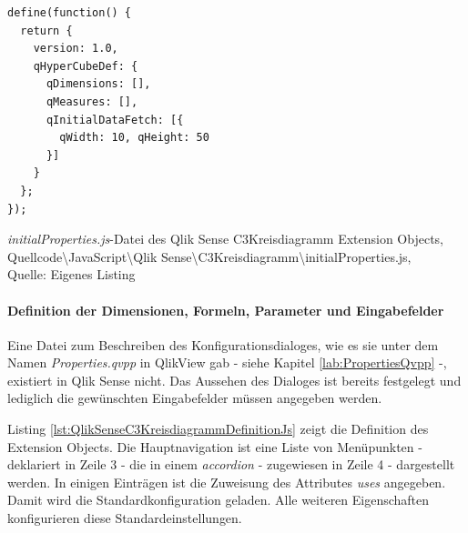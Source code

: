 \begin{listing}[htbp]
\begin{verbatim}
define(function() {
  return {
    version: 1.0,
    qHyperCubeDef: {
      qDimensions: [],
      qMeasures: [],
      qInitialDataFetch: [{
        qWidth: 10, qHeight: 50
      }]
    }
  };
});
\end{verbatim}
\caption[\textit{initialProperties.js}-Datei des Qlik Sense C3Kreisdiagramm Extension Objects]{\textit{initialProperties.js}-Datei des Qlik Sense C3Kreisdiagramm Extension Objects, \\Quellcode\textbackslash{}JavaScript\textbackslash{}Qlik Sense\textbackslash{}C3Kreisdiagramm\textbackslash{}initialProperties.js, \\Quelle: Eigenes Listing}
\label{lst:QlikSenseC3KreisdiagrammInitialPropertiesJs}
\end{listing}

\paragraph{Definition der Dimensionen, Formeln, Parameter und Eingabefelder}

Eine Datei zum Beschreiben des Konfigurationsdialoges, wie es sie unter dem Namen \textit{Properties.qvpp} in QlikView gab - siehe Kapitel \ref{lab:PropertiesQvpp} -, existiert in Qlik Sense nicht. Das Aussehen des Dialoges ist bereits festgelegt und lediglich die gewünschten Eingabefelder müssen angegeben werden.

Listing \ref{lst:QlikSenseC3KreisdiagrammDefinitionJs} zeigt die Definition des Extension Objects. Die Hauptnavigation ist eine Liste von Menüpunkten - deklariert in Zeile 3 - die in einem \textit{accordion} - zugewiesen in Zeile 4 - dargestellt werden. In einigen Einträgen ist die Zuweisung des Attributes \textit{uses} angegeben. Damit wird die Standardkonfiguration geladen. Alle weiteren Eigenschaften konfigurieren diese Standardeinstellungen.

